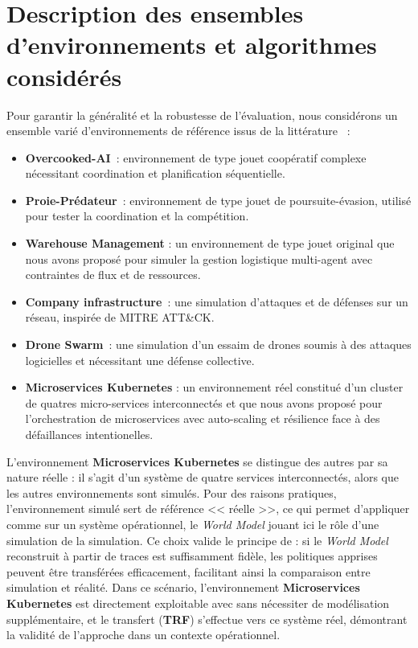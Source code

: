 \section{Description des ensembles d'environnements et algorithmes considérés}

Pour garantir la généralité et la robustesse de l’évaluation, nous considérons un ensemble varié d’environnements de référence issus de la littérature ~:
\begin{itemize}
  \item \textbf{Overcooked-AI}~\cite{overcookedai}: environnement de type jouet coopératif complexe nécessitant coordination et planification séquentielle.
  \item \textbf{Proie-Prédateur}~\cite{lowe2017multi}: environnement  de type jouet de poursuite-évasion, utilisé pour tester la coordination et la compétition.
  \item \textbf{Warehouse Management} : un environnement  de type jouet original que nous avons proposé pour simuler la gestion logistique multi-agent avec contraintes de flux et de ressources.
  \item \textbf{Company infrastructure}~\cite{cyberbattlesim}: une simulation d’attaques et de défenses sur un réseau, inspirée de MITRE ATT\&CK.
  \item \textbf{Drone Swarm}~\cite{cage_challenge_3_announcement}: une simulation d'un essaim de drones soumis à des attaques logicielles et nécessitant une défense collective.
  \item \textbf{Microservices Kubernetes} : un environnement réel constitué d'un cluster de quatres micro-services interconnectés et que nous avons proposé pour l'orchestration de microservices avec auto-scaling et résilience face à des défaillances intentionelles.
\end{itemize}

L’environnement \textbf{Microservices Kubernetes} se distingue des autres par sa nature réelle : il s’agit d’un système de quatre services interconnectés, alors que les autres environnements sont simulés. Pour des raisons pratiques, l’environnement simulé sert de référence << réelle >>, ce qui permet d’appliquer  comme sur un système opérationnel, le \textit{World Model} jouant ici le rôle d’une simulation de la simulation. Ce choix valide le principe de  : si le \textit{World Model} reconstruit à partir de traces est suffisamment fidèle, les politiques apprises peuvent être transférées efficacement, facilitant ainsi la comparaison entre simulation et réalité. Dans ce scénario, l’environnement \textbf{Microservices Kubernetes} est directement exploitable avec  sans nécessiter de modélisation supplémentaire, et le transfert (\textbf{TRF}) s’effectue vers ce système réel, démontrant la validité de l’approche dans un contexte opérationnel.

